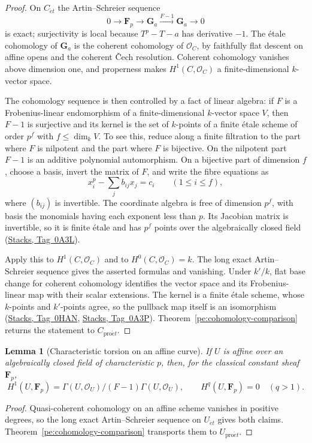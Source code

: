 \documentclass[11pt,a4paper]{article}
\numberwithin{equation}{section}
\newtheorem{lemma}[theorem]{Lemma}
\theoremstyle{definition}
\theoremstyle{remark}
\newcommand{\et}{\acute{e}t}
\newcommand{\proet}{\mathrm{pro}\acute{e}t}
\newcommand{\stacks}[1]{\href{https://stacks.math.columbia.edu/tag/#1}{\textnormal{Stacks, Tag~#1}}}
\newcommand{\cO}{\mathcal O}
\begin{document}
\begin{proof}
On $C_{\et}$ the Artin--Schreier sequence
\[
 0\longrightarrow\mathbf F_p\longrightarrow\mathbf G_a
 \xrightarrow{F-1}\mathbf G_a\longrightarrow0
\]
is exact; surjectivity is local because $T^p-T-a$ has derivative $-1$.
The \'etale cohomology of $\mathbf G_a$ is the coherent cohomology of
$\cO_C$, by faithfully flat descent on affine opens and the coherent
\v Cech resolution.  Coherent cohomology vanishes above dimension one,
and properness makes $H^1(C,\cO_C)$ a finite-dimensional $k$-vector
space.

The cohomology sequence is then controlled by a fact of linear
algebra: if $F$ is a Frobenius-linear endomorphism of a
finite-dimensional $k$-vector space $V$, then $F-1$ is surjective and
its kernel is the set of $k$-points of a finite \'etale scheme of
order $p^f$ with $f\leq\dim_k V$.  To see this, reduce along a finite
filtration to the part where $F$ is nilpotent and the part where $F$ is
bijective.  On the nilpotent part $F-1$ is an additive polynomial
automorphism.  On a bijective part of dimension $f$, choose a basis,
invert the matrix of $F$, and write the fibre equations as
\[
 x_i^p-\sum_j b_{ij}x_j=c_i\qquad(1\leq i\leq f),
\]
where $(b_{ij})$ is invertible.  The coordinate algebra is free of
dimension $p^f$, with basis the monomials having each exponent less
than $p$.  Its Jacobian matrix is invertible, so it is finite \'etale
and has $p^f$ points over the algebraically closed field
(\stacks{0A3L}).

Apply this to $H^1(C,\cO_C)$ and to $H^0(C,\cO_C)=k$.  The long exact
Artin--Schreier sequence gives the asserted formulas and vanishing.
Under $k'/k$, flat base change for coherent cohomology identifies the
vector space and its Frobenius-linear map with their scalar
extensions.  The kernel is a finite \'etale scheme, whose $k$-points
and $k'$-points agree, so the pullback map itself is an isomorphism
(\stacks{0HAN}, \stacks{0A3P}).  Theorem~\ref{pe:cohomology-comparison}
returns the statement to $C_{\proet}$.
\end{proof}

\begin{lemma}[Characteristic torsion on an affine curve]
\label{app:curve-affine-artin-schreier}
If $U$ is affine over an algebraically closed field of characteristic
$p$, then, for the classical constant sheaf $\mathbf F_p$,
\[
 H^1(U,\mathbf F_p)=
 \Gamma(U,\cO_U)/(F-1)\Gamma(U,\cO_U),\qquad
 H^q(U,\mathbf F_p)=0\quad(q>1).
\]
\end{lemma}
\begin{proof}
Quasi-coherent cohomology on an affine scheme vanishes in positive
degrees, so the long exact Artin--Schreier sequence on $U_{\et}$ gives
both claims.  Theorem~\ref{pe:cohomology-comparison} transports them to
$U_{\proet}$.
\end{proof}
\end{document}
